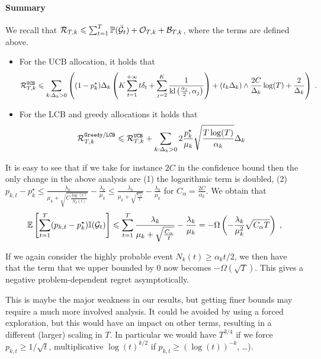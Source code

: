 \paragraph{Summary} We recall that $\mathcal{R}_{T,k}\leqslant \sum_{t=1}^T \mathbb{P}(\bar {\mathcal{G}}_t)+\mathcal{O}_{T, k}+ \mathcal{B}_{T,k}$, where the terms are defined above. 
\begin{itemize}
	\item For the UCB allocation, it holds that 
	\[\mathcal{R}_{T,k}^\text{\texttt{UCB}} \leqslant \sum_{k: \Delta_k>0}\left((1-p_k^\star)\Delta_k \left(K \sum_{t=1}^{+\infty} t\delta_t + \sum_{j=2}^K\frac{1}{\text{\normalfont kl}\left(\frac{\alpha_j}{2}, \alpha_j\right)}\right) + (t_k\Delta_k) \wedge  \frac{2C}{\Delta_k}\log(T) + \frac{2}{\Delta_k} \right) \;. \]
	\item For the LCB and greedy allocations it holds that 
	\[ \mathcal{R}_{T,k}^{\texttt{Greedy}/\texttt{LCB}} \leqslant \mathcal{R}_{T,k}^{\texttt{UCB}} + \sum_{k:\Delta_k>0} 2\frac{p_k^\star}{\mu_k}\sqrt{\frac{T\log(T)}{\alpha_k}} \Delta_k
	\]
\end{itemize}



\begin{remark} 
	
	It is easy to see that if we take for instance $2C$ in the confidence bound then the only change in the above analysis are (1) the logarithmic term is doubled, (2) $p_{k, t}-p_k^\star\leq \frac{\lambda_k}{\mu_k+\sqrt{C\frac{\log(t)}{N_k(t)}}}-\frac{\lambda_k}{\mu_k}\leq \frac{\lambda_k}{\mu_k+\sqrt{\frac{C_\alpha}{t}}}-\frac{\lambda_k}{\mu_k}$ for $C_\alpha=\frac{2C}{\alpha_k}$. We obtain that
	\[\mathbb{E}\left[\sum_{t=1}^T(p_{k,t}-p_k^\star)\mathbb{I}(\mathcal{G}_t)\right] \leqslant \sum_{t=1}^T \frac{\lambda_k}{\mu_k+\sqrt{\frac{C_\alpha}{t}}}-\frac{\lambda_k}{\mu_k} = -\Omega\left(-\frac{\lambda_k}{\mu_k^2}\sqrt{C_\alpha T}\right)\;,
	\]
	
	If we again consider the highly probable event $N_k(t)\geq \alpha_k t/2$, we then have that the term that we upper bounded by $0$ now becomes $-\Omega(\sqrt{T})$. This gives a negative problem-dependent regret asymptotically.
\end{remark}


\begin{remark} 
	This is maybe the major weakness in our results, but getting finer bounds may require a much more involved analysis. It could be avoided by using a forced exploration, but this would have an impact on other terms, resulting in a different (larger) scaling in $T$. In particular we would have $T^{3/4}$ if we force $p_{k,t}\geq 1/\sqrt{t}$, multiplicative $\log(t)^{k/2}$ if $p_{k,t}\geq (\log(t))^{-k}$, \dots). 
\end{remark}

